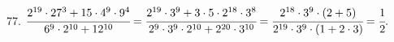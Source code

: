 77. $\cfrac{2^{19}\cdot27^3+15\cdot4^9\cdot9^4}{6^9\cdot2^{10}+12^{10}}=\cfrac{2^{19}\cdot3^9+3\cdot5\cdot2^{18}\cdot3^8}{2^9\cdot3^9\cdot2^{10}+2^{20}\cdot3^{10}}=
\cfrac{2^{18}\cdot3^9\cdot(2+5)}{2^{19}\cdot3^9\cdot(1+2\cdot3)}=\cfrac{1}{2}.$\\
